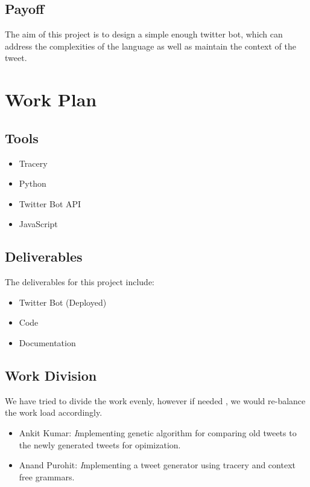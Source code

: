 \documentclass[11pt]{article}
\begin{document}
        \subsection{Payoff}
        The aim of this project is to design a simple enough twitter bot, which can address the complexities of the language as well as maintain the context of the tweet.

    \section{Work Plan}
        \subsection{Tools}
        \begin{itemize}
            \item Tracery
            \item Python
            \item Twitter Bot API
            \item JavaScript
        \end{itemize}

        \subsection{Deliverables}
        The deliverables for this project include:
        \begin{itemize}
            \item Twitter Bot (Deployed)
            \item Code
            \item Documentation
        \end{itemize}

        \subsection{Work Division}
        We have tried to divide the work evenly, however if needed , we would re-balance the work load accordingly.
        \begin{itemize}
            \item Ankit Kumar: \textit Implementing genetic algorithm for comparing old tweets to the newly generated tweets for opimization.
            \item Anand Purohit: \textit Implementing a tweet generator using tracery and context free grammars.
        \end{itemize}
        
\end{document}
